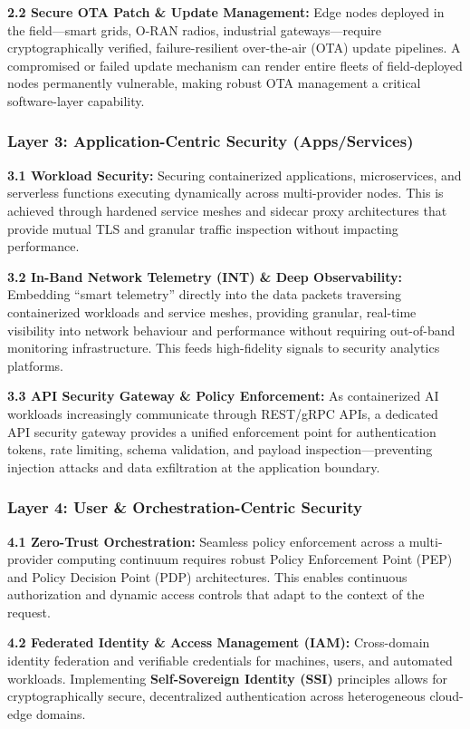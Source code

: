 \documentclass[12pt,a4paper]{report}
\begin{document}
\textbf{2.2 Secure OTA Patch \& Update Management:} Edge nodes deployed in the field---smart grids, O-RAN radios, industrial gateways---require cryptographically verified, failure-resilient over-the-air (OTA) update pipelines. A compromised or failed update mechanism can render entire fleets of field-deployed nodes permanently vulnerable, making robust OTA management a critical software-layer capability.

\subsubsection*{Layer 3: Application-Centric Security (Apps/Services)}
\textbf{3.1 Workload Security:} Securing containerized applications, microservices, and serverless functions executing dynamically across multi-provider nodes. This is achieved through hardened service meshes and sidecar proxy architectures that provide mutual TLS and granular traffic inspection without impacting performance.

\textbf{3.2 In-Band Network Telemetry (INT) \& Deep Observability:} Embedding ``smart telemetry'' directly into the data packets traversing containerized workloads and service meshes, providing granular, real-time visibility into network behaviour and performance without requiring out-of-band monitoring infrastructure. This feeds high-fidelity signals to security analytics platforms.

\textbf{3.3 API Security Gateway \& Policy Enforcement:} As containerized AI workloads increasingly communicate through REST/gRPC APIs, a dedicated API security gateway provides a unified enforcement point for authentication tokens, rate limiting, schema validation, and payload inspection---preventing injection attacks and data exfiltration at the application boundary.

\subsubsection*{Layer 4: User \& Orchestration-Centric Security}
\textbf{4.1 Zero-Trust Orchestration:} Seamless policy enforcement across a multi-provider computing continuum requires robust Policy Enforcement Point (PEP) and Policy Decision Point (PDP) architectures. This enables continuous authorization and dynamic access controls that adapt to the context of the request.

\textbf{4.2 Federated Identity \& Access Management (IAM):} Cross-domain identity federation and verifiable credentials for machines, users, and automated workloads. Implementing \textbf{Self-Sovereign Identity (SSI)} principles allows for cryptographically secure, decentralized authentication across heterogeneous cloud-edge domains.
\end{document}
